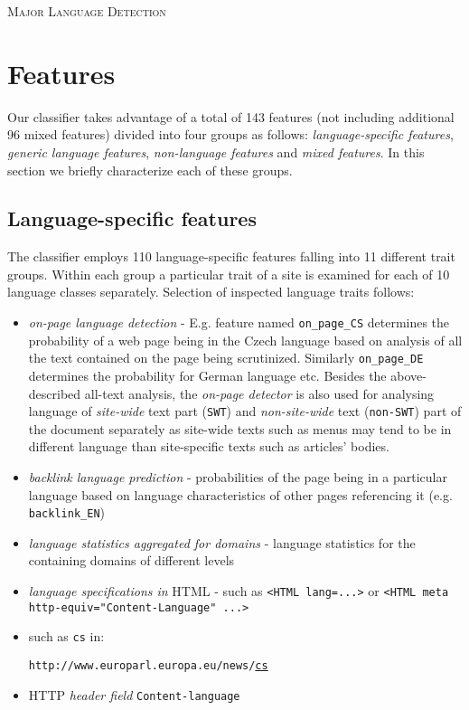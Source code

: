 \documentclass[12pt,a4paper]{article}     %
\begin{document}
  \begin{center}  
    \textsc{\Large Major Language Detection}
  \end{center}

  \section{Features}
  Our classifier takes advantage of a total of 143 features (not including additional 96 mixed features) divided into four groups
  as follows: \textit{language-specific features}, \textit{generic language features}, \textit{non-language
  features} and \textit{mixed features}. In this section we briefly characterize each of these
  groups.

  \subsection{Language-specific features}

  The classifier employs 110 language-specific features falling into 11 different trait groups. Within each group a
  particular trait of a site is examined for each of 10 language classes separately. Selection of
  inspected language traits follows: 
  \begin{itemize}
    \item \textit{on-page language detection} - E.g. feature named \texttt{on\_page\_CS} determines the
      probability of a web page being in the Czech language based on analysis of all the text
      contained on the page being scrutinized. Similarly \texttt{on\_page\_DE} determines the
      probability for German language etc. Besides the above-described all-text analysis, the \textit{on-page 
      detector} is also used for analysing language of \textit{site-wide} text part (\texttt{SWT}) and
    \textit{non-site-wide} text (\texttt{non-SWT}) part of the document separately as site-wide texts 
      such as menus may tend to be in different language than site-specific texts such as articles' bodies.
    \item \textit{backlink language prediction} - probabilities of the page being in a particular
      language based on language characteristics of other pages referencing it (e.g.
      \texttt{backlink\_EN})
    \item \textit{language statistics aggregated for domains} - language statistics for the
      containing domains of different levels
    \item \textit{language specifications in} HTML - such as \texttt{<HTML lang=...>} or \texttt{<HTML
      meta http-equiv="Content-Language"  ...>}
    \item {} such as \texttt{cs} in:

    \texttt{http://www.europarl.europa.eu/news/}\underline{\texttt{cs}} 
    \item HTTP \textit{header field} \texttt{Content-language}
  \end{itemize}
\end{document}
